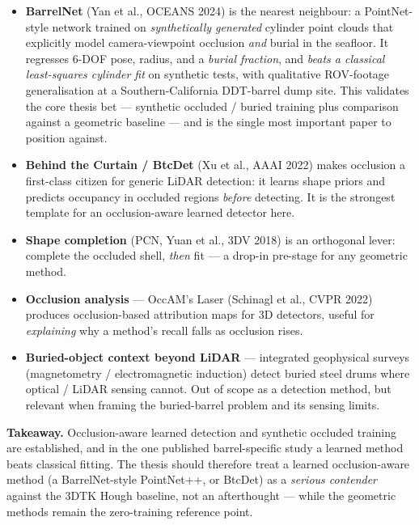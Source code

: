 \documentclass[10pt,a4paper]{article}
\begin{document}
\begin{itemize}[leftmargin=1.4em,itemsep=3pt,topsep=2pt]
  \item \textbf{BarrelNet} (Yan et al., OCEANS 2024) is the nearest neighbour: a
  PointNet-style network trained on \emph{synthetically generated} cylinder point clouds
  that explicitly model camera-viewpoint occlusion \emph{and} burial in the seafloor. It
  regresses 6-DOF pose, radius, and a \emph{burial fraction}, and \emph{beats a classical
  least-squares cylinder fit} on synthetic tests, with qualitative ROV-footage
  generalisation at a Southern-California DDT-barrel dump site. This validates the core
  thesis bet --- synthetic occluded / buried training plus comparison against a geometric
  baseline --- and is the single most important paper to position against.

  \item \textbf{Behind the Curtain / BtcDet} (Xu et al., AAAI 2022) makes occlusion a
  first-class citizen for generic LiDAR detection: it learns shape priors and predicts
  occupancy in occluded regions \emph{before} detecting. It is the strongest template for
  an occlusion-aware learned detector here.

  \item \textbf{Shape completion} (PCN, Yuan et al., 3DV 2018) is an orthogonal lever:
  complete the occluded shell, \emph{then} fit --- a drop-in pre-stage for any geometric
  method.

  \item \textbf{Occlusion analysis} --- OccAM's Laser (Schinagl et al., CVPR 2022)
  produces occlusion-based attribution maps for 3D detectors, useful for \emph{explaining}
  why a method's recall falls as occlusion rises.

  \item \textbf{Buried-object context beyond LiDAR} --- integrated geophysical surveys
  (magnetometry / electromagnetic induction) detect buried steel drums where optical /
  LiDAR sensing cannot. Out of scope as a detection method, but relevant when framing the
  buried-barrel problem and its sensing limits.
\end{itemize}

\noindent\textbf{Takeaway.} Occlusion-aware learned detection and synthetic occluded
training are established, and in the one published barrel-specific study a learned method
beats classical fitting. The thesis should therefore treat a learned occlusion-aware
method (a BarrelNet-style PointNet++, or BtcDet) as a \emph{serious contender} against the
3DTK Hough baseline, not an afterthought --- while the geometric methods remain the
zero-training reference point.
\end{document}
